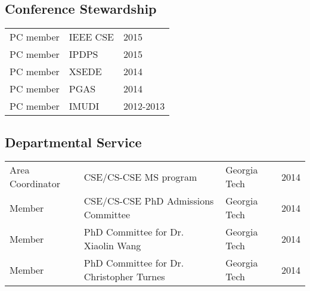 \documentclass[letterpaper]{article}
\renewenvironment{itemize}{
  \begin{list}{}{
    \setlength{\leftmargin}{1.5em}
  }
}{
  \end{list}
}
\begin{document}
\subsection*{Conference Stewardship}
\begin{tabular}{lll}
PC member & IEEE CSE & 2015 \\
PC member & IPDPS & 2015 \\
PC member & XSEDE & 2014 \\
PC member & PGAS & 2014 \\
PC member & IMUDI & 2012-2013 \\
\end{tabular}

\subsection*{Departmental Service}
\begin{tabular}{llll}
Area Coordinator & CSE/CS-CSE MS program & Georgia Tech & 2014 \\
Member           & CSE/CS-CSE PhD Admissions Committee  & Georgia Tech & 2014 \\
Member           & PhD Committee for Dr. Xiaolin Wang   & Georgia Tech & 2014 \\
Member           & PhD Committee for Dr. Christopher Turnes & Georgia Tech & 2014 
\end{tabular}

\end{document}
